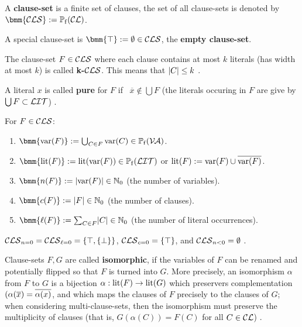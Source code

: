 \documentclass[12pt]{book}
\begin{document}
\begin{defi}\label{def:cls}
      A \textbf{clause-set} is a finite set of clauses, the set of all clause-sets is denoted by $\bmm{\Cls} := \pote(\Cl)$.

      A special clause-set is $\bmm{\top} := \es \in \Cls$, the \textbf{empty clause-set}.
\end{defi}
\begin{defi}\label{def:cls2}
      The clause-set $F \in \mathcal{CLS}$ where each clause contains at most $k$ literals (has width at most $k$) is called \textbf{k-}$\mathcal{CLS}$.
      This means that $\lvert C \rvert \leq k$ \cite{h5}.
\end{defi}
\begin{defi}\label{def:cls3}
      A literal $x$ is called \textbf{pure} for $F$ if \ $\overline{x} \not \in \bigcup F$ 
      (the literals occuring in $F$ are give by $\bigcup F \subset \mathcal{LIT}$) \cite{h5}.
\end{defi}
\begin{defi}\label{def:cls4}
      For $F \in \mathcal{CLS}$:
      \begin{enumerate}
            \item $\bmm{\var(F)} := \bc_{C \in F} \var(C) \in \pote(\Va)$.
            \item $\bmm{\lit(F)} := \lit(\var(F)) \in \pote(\Lit)$ or $\operatorname{lit}(F) := \operatorname{var}(F) \cup \overline{\operatorname{var}(F)}$.
            \item $\bmm{n(F)} := \abs{\var(F)} \in \NNZ$ (the number of variables).
            \item $\bmm{c(F)} := \abs{F} \in \NNZ$ (the number of clauses).
            \item $\bmm{\ell(F)} := \sum_{C \in F} \abs{C} \in \NNZ$ (the number of literal occurrences).
      \end{enumerate}
\end{defi}
\begin{examp}\label{exp:classescls}
  $\mathcal{CLS}_{n=0} = \mathcal{CLS}_{\ell=0} = \{ \top, \{ \bot \} \}$, $\mathcal{CLS}_{c=0} = \{ \top \}$, and $\mathcal{CLS}_{n<0} = \emptyset$ \cite{h9}.
\end{examp}
\begin{defi}\label{def:cls6}
      Clause-sets $F,G$ are called \textbf{isomorphic}, if the variables of $F$ can be renamed and potentially flipped so that $F$ is 
	  turned into $G$. More precisely, an isomorphism $\alpha$ from $F$ to $G$ is a bijection $\alpha : \operatorname{lit}(F) \rightarrow \operatorname{lit}(G)$ 
	  which preservers complementation $(\alpha(\overline x) = \overline {\alpha(x)}$, and which maps the clauses of $F$ precisely to the 
	  clauses of $G$; when considering multi-clause-sets, then the isomorphism must preserve the multiplicity of clauses (that is, 
	  $G(\alpha(C)) = F(C)$ for all $C \in \mathcal{CL}$) \cite{h9}.
\end{defi}
\end{document}
